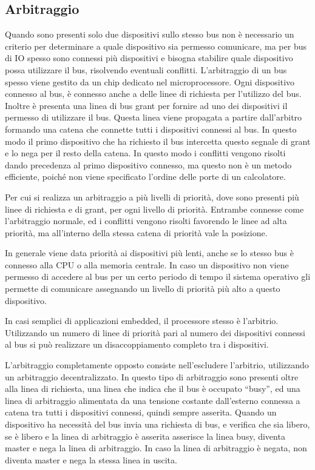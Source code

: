 \documentclass{article}
\numberwithin{equation}{subsection}
\begin{document}
\subsection{Arbitraggio}

Quando sono presenti solo due dispositivi sullo stesso bus non è necessario un criterio per determinare a quale dispositivo sia permesso comunicare, ma per bus di IO spesso 
sono connessi più dispositivi e bisogna stabilire quale dispositivo possa utilizzare il bus, risolvendo eventuali conflitti. 
L'arbitraggio di un bus spesso viene gestito da un chip dedicato nel microprocessore. Ogni dispositivo connesso al bus, è connesso anche a delle linee di richiesta per 
l'utilizzo del bus. Inoltre è presenta una linea di bus grant per fornire ad uno dei dispositivi il permesso di utilizzare il bus. Questa linea viene propagata a partire 
dall'arbitro formando una catena che connette tutti i dispositivi connessi al bus. In questo modo il primo dispositivo che ha richiesto il bus intercetta questo segnale di 
grant e lo nega per il resto della catena. 
In questo modo i conflitti vengono risolti dando precedenza al primo dispositivo connesso, ma questo non è un metodo efficiente, poiché non viene specificato l'ordine delle porte 
di un calcolatore. 

Per cui si realizza un arbitraggio a più livelli di priorità, dove sono presenti più linee di richiesta e di grant, per ogni livello di priorità. Entrambe connesse 
come l'arbitraggio normale, ed i conflitti vengono risolti favorendo le linee ad alta priorità, ma all'interno della stessa catena di priorità vale la posizione. 

In generale viene data priorità ai dispositivi più lenti, anche se lo stesso bus è connesso alla CPU o alla memoria centrale. In caso un dispositivo non viene permesso di 
accedere al bus per un certo periodo di tempo il sistema operativo gli permette di comunicare assegnando un livello di priorità più alto a questo dispositivo. 

In casi semplici di applicazioni embedded, il processore stesso è l'arbitrio. Utilizzando un numero di linee di priorità pari al numero dei dispositivi connessi al bus si può 
realizzare un disaccoppiamento completo tra i dispositivi. 

L'arbitraggio completamente opposto consiste nell'escludere l'arbitrio, utilizzando un arbitraggio decentralizzato. In questo tipo di arbitraggio sono presenti oltre alla linea 
di richiesta, una linea che indica che il bus è occupato ``busy'', ed una linea di arbitraggio alimentata da una tensione costante dall'esterno connessa a catena tra tutti i 
dispositivi connessi, quindi sempre asserita. Quando un dispositivo ha necessità del bus invia una richiesta di bus, e verifica che sia libero, se è libero e la linea di arbitraggio è asserita 
asserisce la linea busy, diventa master e nega la linea di arbitraggio. In caso la linea di arbitraggio è negata, non diventa master e nega la stessa linea in uscita. 
\end{document}
